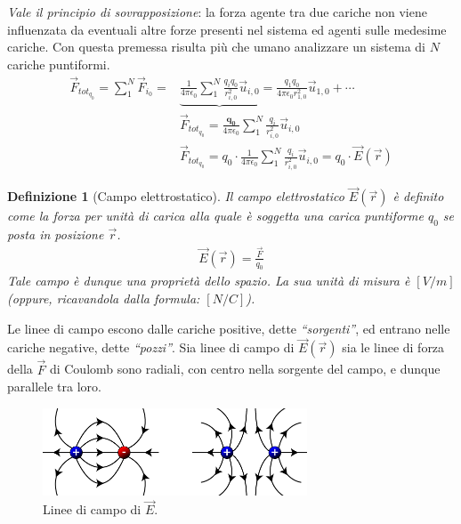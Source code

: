 \documentclass[a4paper,12pt,titlepage,openany]{book}
\theoremstyle{mydef}
\newtheorem{definizione}{Definizione}[chapter]
\begin{document}
            \emph{Vale il principio di sovrapposizione}: la forza agente tra due cariche non viene influenzata da
            eventuali altre forze presenti nel sistema ed agenti sulle medesime cariche. Con questa premessa risulta
            più che umano analizzare un sistema di $N$ cariche puntiformi.
            \begin{align*}
                \vec{F}_{tot_{q_0}} = \sum_{1}^{N}{\vec{F}_{i_0}} =
                &\underbrace{\frac{1}{4\pi\epsilon_0}\sum_{1}^{N}{\frac{q_iq_0}{r_{i,0}^2}\vec{u}_{i,0}}} =
                \frac{q_1q_0}{4\pi\epsilon_0r_{1,0}^2}\vec{u}_{1,0} + \dotsb\\
                &\vec{F}_{tot_{q_0}} = 
                \frac{\mathbf{q_0}}{4\pi\epsilon_0}\sum_{1}^{N}{\frac{q_i}{r_{i,0}^2}\vec{u}_{i,0}}\\
                &\vec{F}_{tot_{q_0}} = 
                q_0\cdot\frac{1}{4\pi\epsilon_0}\sum_{1}^{N}{\frac{q_i}{r_{i,0}^2}\vec{u}_{i,0}} =
                q_0\cdot\vec{E}(\vec{r})
            \end{align*}
            \begin{definizione}[Campo elettrostatico]
                Il campo elettrostatico $\vec{E}(\vec{r})$ è definito come la forza per unità
                di carica alla quale è soggetta una carica puntiforme $q_0$ se posta in posizione $\vec{r}$.
                \begin{align}
                    \boxed{\vec{E}(\vec{r}) = \frac{\vec{F}}{q_0}}
                \end{align}
                Tale campo è dunque una \emph{proprietà dello spazio}.
                La sua unità di misura è $[V/m]$ (oppure, ricavandola dalla formula: $[N/C]$).
            \end{definizione}
            
            \noindent
            Le linee di campo escono dalle cariche positive, dette \emph{``sorgenti''}, ed entrano nelle cariche
            negative, dette \emph{``pozzi''}.
            Sia linee di campo di $\vec{E}(\vec{r})$ sia le linee di forza della $\vec{F}$
            di Coulomb sono radiali, con centro nella sorgente del campo, e dunque parallele tra loro.
            \begin{figure}[htp]
                \centering
                \includegraphics[width=0.7\textwidth]{linee_campo}
                \caption{Linee di campo di $\vec{E}$.}
            \end{figure}
            
\end{document}
